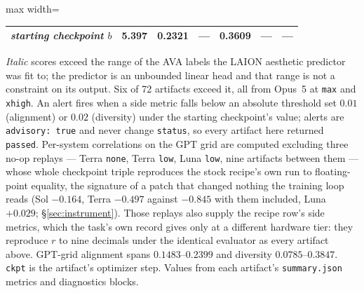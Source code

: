 \begin{table}[t]
\begin{adjustbox}{max width=\linewidth}
\begin{tabular}{llrrrrrrc}
\multicolumn{3}{l}{\emph{starting checkpoint $b$}} & 5.397 & 0.2321 & --- & 0.3609 & --- & --- \\
\bottomrule
\end{tabular}
\end{adjustbox}
\par\vspace{2pt}
{\footnotesize \emph{Italic} scores exceed the range of the AVA labels the LAION aesthetic
predictor was fit to; the predictor is an unbounded linear head and that range is not a
constraint on its output. Six of 72 artifacts exceed it, all from Opus~5 at
\texttt{max} and \texttt{xhigh}. An alert fires when a side metric falls below an absolute
threshold set $0.01$ (alignment) or $0.02$ (diversity) under the starting checkpoint's value;
alerts are \texttt{advisory: true} and never change \texttt{status}, so every artifact here
returned \texttt{passed}. Per-system correlations on the GPT grid are computed excluding
three no-op replays --- Terra \texttt{none}, Terra \texttt{low}, Luna \texttt{low}, nine
artifacts between them --- whose whole checkpoint triple reproduces the stock recipe's own run to
floating-point equality, the signature of a patch that changed nothing the training loop reads
(Sol $-0.164$, Terra $-0.497$ against $-0.845$ with them included, Luna $+0.029$;
\S\ref{sec:instrument}). Those
replays also supply the recipe row's side metrics, which the task's own record gives only at a
different hardware tier: they reproduce $r$ to nine decimals under the identical evaluator as
every artifact above. GPT-grid
alignment spans $0.1483$--$0.2399$ and diversity $0.0785$--$0.3847$. \texttt{ckpt} is the
artifact's optimizer step. Values from each artifact's \texttt{summary.json} metrics and
diagnostics blocks.}
\end{table}
